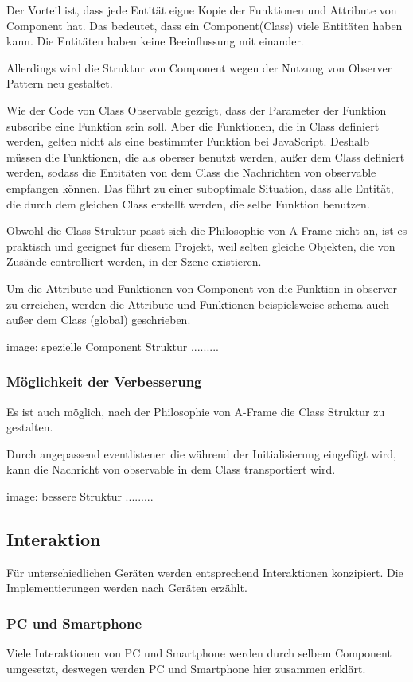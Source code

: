  Der Vorteil ist, dass jede Entität eigne Kopie der Funktionen und Attribute von Component hat. Das bedeutet, dass ein Component(Class) viele Entitäten haben kann. Die Entitäten haben keine Beeinflussung mit einander.
 
 Allerdings wird die Struktur von Component wegen der Nutzung von Observer Pattern neu gestaltet.
 
 Wie der Code von Class Observable gezeigt, dass der Parameter der Funktion subscribe eine Funktion sein soll. Aber die Funktionen, die in Class definiert werden, gelten nicht als eine bestimmter Funktion bei JavaScript. Deshalb müssen die Funktionen, die als oberser benutzt werden, außer dem Class definiert werden, sodass die Entitäten von dem Class die Nachrichten von observable empfangen können. Das führt zu einer suboptimale Situation, dass alle Entität, die durch dem gleichen Class erstellt werden, die selbe Funktion benutzen.
 
 Obwohl die Class Struktur passt sich die Philosophie von A-Frame nicht an, ist es praktisch und geeignet für diesem Projekt, weil selten gleiche Objekten, die von Zusände controlliert werden, in der Szene existieren.
 
 Um die Attribute und Funktionen von Component von die Funktion in observer zu erreichen, werden die Attribute und Funktionen beispielsweise schema auch außer dem Class (global) geschrieben.
 
 image: spezielle Component Struktur .........
 
 \subsubsection{Möglichkeit der Verbesserung}
 Es ist auch möglich, nach der Philosophie von A-Frame die Class Struktur zu gestalten.
 
 Durch angepassend \glqq eventlistener\grqq\, die während der Initialisierung eingefügt wird, kann die Nachricht von observable in dem Class transportiert wird.
 
 image: bessere Struktur .........
 
 \subsection{Interaktion}
  Für unterschiedlichen Geräten werden entsprechend Interaktionen konzipiert. Die Implementierungen werden nach Geräten erzählt.
  \subsubsection{PC und Smartphone}
  Viele Interaktionen von PC und Smartphone werden durch selbem Component umgesetzt, deswegen werden PC und Smartphone hier zusammen erklärt.
  
